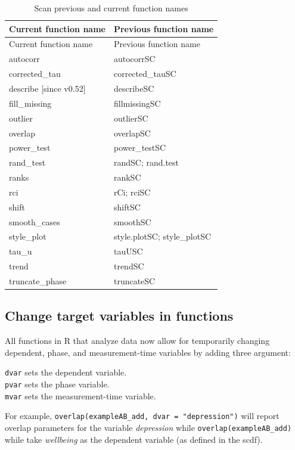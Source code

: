 \documentclass[
  letterpaper,
  DIV=11,
  numbers=noendperiod]{scrreprt}
\begin{document}
\hypertarget{tbl-aliases}{}
\begin{longtable}[]{@{}ll@{}}
\caption{\label{tbl-aliases}Scan previous and current function
names}\tabularnewline
\toprule()
Current function name & Previous function name \\
\midrule()
\endfirsthead
\toprule()
Current function name & Previous function name \\
\midrule()
\endhead
autocorr & autocorrSC \\
corrected\_tau & corrected\_tauSC \\
describe {[}since v0.52{]} & describeSC \\
fill\_missing & fillmissingSC \\
outlier & outlierSC \\
overlap & overlapSC \\
power\_test & power\_testSC \\
rand\_test & randSC; rand.test \\
ranks & rankSC \\
rci & rCi; rciSC \\
shift & shiftSC \\
smooth\_cases & smoothSC \\
style\_plot & style.plotSC; style\_plotSC \\
tau\_u & tauUSC \\
trend & trendSC \\
truncate\_phase & truncateSC \\
\bottomrule()
\end{longtable}

\hypertarget{change-target-variables-in-functions}{%
\subsection{Change target variables in
functions}\label{change-target-variables-in-functions}}

All functions in R that analyze data now allow for temporarily changing
dependent, phase, and measurement-time variables by adding three
argument:

\texttt{dvar} sets the dependent variable.\\
\texttt{pvar} sets the phase variable.\\
\texttt{mvar} sets the measurement-time variable.

For example, \texttt{overlap(exampleAB\_add,\ dvar\ =\ "depression")}
will report overlap parameters for the variable \emph{depression} while
\texttt{overlap(exampleAB\_add)} while take \emph{wellbeing} as the
dependent variable (as defined in the scdf).
\end{document}
